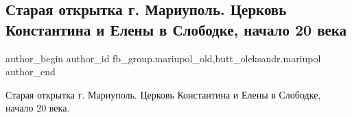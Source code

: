  
 
 
 
 

\subsection{Старая открытка г. Мариуполь. Церковь Константина и Елены в Слободке, начало 20 века}
\label{sec:26_02_2023.fb.fb_group.mariupol_old.1.staraya_otkritka_g__}
 
\ifcmt
 author_begin
   author_id fb_group.mariupol_old,butt_oleksandr.mariupol
 author_end
\fi

Старая открытка г. Мариуполь. Церковь Константина и Елены в Слободке, начало 20 века. 💐🥰

